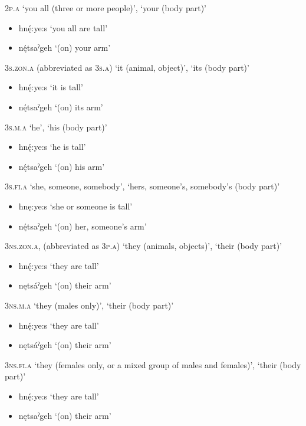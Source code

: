 \ex \textsc{2p.a} ‘you all (three or more people)’, ‘your (body part)’
\begin{itemize}
    \item   {}hnę́:ye:s ‘you all are tall’
    \item   {}nę́tsaˀgeh ‘(on) your arm’
\end{itemize}
\ex \textsc{3s.zon.a} (abbreviated as \textsc{3s.a}) ‘it (animal, object)’, ‘its (body part)’
\begin{itemize}
    \item   {}hnę́:ye:s ‘it is tall’
    \item   {}nę́tsaˀgeh ‘(on) its arm’
\end{itemize}
\ex \textsc{3s.m.a} ‘he’, ‘his (body part)’
\begin{itemize}
    \item   {}hnę́:ye:s ‘he is tall’
    \item   {}nę́tsaˀgeh ‘(on) his arm’
\end{itemize}
\ex \textsc{3s.fi.a} ‘she, someone, somebody’, ‘hers, someone’s, somebody’s (body part)’
\begin{itemize}
    \item   {}hnę:ye:s ‘she or someone is tall’
    \item   {}nę́tsaˀgeh ‘(on) her, someone’s arm’
\end{itemize}
\ex \textsc{3ns.zon.a}, (abbreviated as \textsc{3p.a}) ‘they (animals, objects)’, ‘their (body part)’
\begin{itemize}
    \item   {}hnę́:ye:s ‘they are tall’
    \item   {}nętsáˀgeh ‘(on) their arm’
\end{itemize}
\ex \textsc{3ns.m.a} ‘they (males only)’, ‘their (body part)’ 
\begin{itemize}
    \item   {}hnę́:ye:s ‘they are tall’
    \item   {}nętsáˀgeh ‘(on) their arm’
\end{itemize}
\ex \textsc{3ns.fi.a} ‘they (females only, or a mixed group of males and females)’, ‘their (body part)’
\begin{itemize}
    \item   {}hnę́:ye:s ‘they are tall’
    \item   {}nętsaˀgeh ‘(on) their arm’
\end{itemize}
\z
\z

